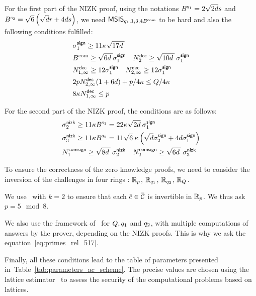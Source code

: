 For the first part of the NIZK proof, using the notations $B^{\text{s}_1} = 
2\sqrt{2d}s$ and $B^{\text{s}_2} = \sqrt{6}\left( \sqrt{d} r + 4 d s\right)$, we need
$\mathsf{MSIS}_{q_1, 1,3, 4B^{\text{com}}}$ to be hard and also the following 
conditions fulfilled:
\begin{equation*}
    \begin{split}
        & \sigma^{\mathsf{sign}}_1 \geq 11 \kappa \sqrt{17 d \:}  \\
        & B^{\text{com}} \geq \sqrt{6 d\:} \sigma^{\mathsf{sign}}_1\quad
        N^{\mathsf{dec}}_2 \geq \sqrt{10 d\:}\: \sigma^{\mathsf{sign}}_1\\
        &N^{\mathsf{dec}}_{1, \infty} \geq 12\sigma^{\mathsf{sign}}_1\quad
        N^{\mathsf{dec}}_{2, \infty} \geq 12\sigma^{\mathsf{sign}}_1  \\
        & 2p N^{\mathsf{dec}}_{2, \infty} (1 + 6d) + p/4\kappa \leq Q /4 
\kappa \\
        & 8 \kappa N^{\mathsf{dec}}_{1, \infty} \leq p
    \end{split}
\end{equation*}

For the second part of the NIZK proof, the conditions are as follows:
\begin{align*}
     & \sigma^{\mathsf{nizk}}_2 \geq 11 \kappa B^{\text{s}_1} = 22\kappa \sqrt{2d} \: 
    \sigma^{\mathsf{sign}}_1                                                 \\
     & \sigma^{\mathsf{nizk}}_3 \geq 11 \kappa B^{\text{s}_2} = 11 \sqrt{6}\: \kappa \left(  
\sqrt{d} \sigma^{\mathsf{sign}}_2 + 4 d \sigma^{\mathsf{sign}}_1\right) \\
     & N^{\mathsf{comsign}}_1 \geq \sqrt{8 d\: }\:\sigma^{\mathsf{nizk}}_2 \quad 
N^{\mathsf{comsign}}_2 \geq \sqrt{6 d\: }\: \sigma^{\mathsf{nizk}}_3
\end{align*}

To ensure the correctness of the zero knowledge proofs, we need to consider 
the inversion of the challenges in four rings : $\mathbb{R}_p$, $\mathbb{R}_{q_1}$,
$\mathbb{R}_{q_2}$, $\mathbb{R}_Q$.

We use~\cite[Lemma~2.1]{CCS:delLyuSei18} with $k=2$ to ensure that 
each $\bar{c} \in \SetDiffChallenges$ is invertible in $\mathbb{R}_p$. We thus
ask $p = 5 \mod 8$.

We also use the framework of~\cite{C:AttLyuSei20} for $Q, q_1$ and 
$q_2$, with multiple computations of answers by the prover, depending on
the NIZK proofs. This is why we ask the equation~\eqref{eq:primes_rel_517}.

Finally, all these conditions lead to the table of 
parameters presented in~Table~\ref{tab:parameters_ac_scheme}. 
The precise values are chosen using
the lattice estimator~\cite{DBLP:journals/jmc/AlbrechtPS15} to assess
the security of the computational problems based on lattices.

